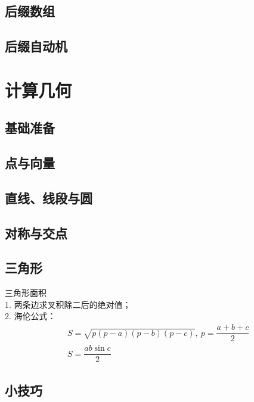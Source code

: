 \documentclass{probook}
\begin{document}
\section{后缀数组} 
 
\section{后缀自动机} 
 



\chapter{计算几何}
\section{基础准备} 

\section{点与向量} 

\section{直线、线段与圆} 

\section{对称与交点} 

\section{三角形} 
三角形面积\\
1. 两条边求叉积除二后的绝对值；\\
2. 海伦公式：
$$
\begin{aligned}
&S = \sqrt{p(p - a)(p - b)(p - c)}, \ p = \dfrac{a + b + c}{2} \\
&S = \dfrac{ab\sin{c}}{2}
\end{aligned}
$$

\section{小技巧} 

\end{document}
